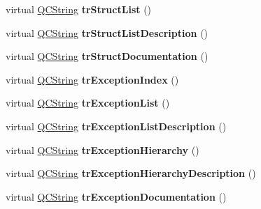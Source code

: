 \begin{DoxyCompactItemize}
\item 
\mbox{\label{class_translator_french_ad70154ed76d8e9ecb70dcb69670c85cc}} 
virtual \mbox{\hyperlink{class_q_c_string}{Q\+C\+String}} {\bfseries tr\+Struct\+List} ()
\item 
\mbox{\label{class_translator_french_a7088a03a1a5bf6859de2c712977f3110}} 
virtual \mbox{\hyperlink{class_q_c_string}{Q\+C\+String}} {\bfseries tr\+Struct\+List\+Description} ()
\item 
\mbox{\label{class_translator_french_a23f84074175cd65727c9ae6ccfa7d615}} 
virtual \mbox{\hyperlink{class_q_c_string}{Q\+C\+String}} {\bfseries tr\+Struct\+Documentation} ()
\item 
\mbox{\label{class_translator_french_a1d8d97128bdbfbdcb183505533dc48a5}} 
virtual \mbox{\hyperlink{class_q_c_string}{Q\+C\+String}} {\bfseries tr\+Exception\+Index} ()
\item 
\mbox{\label{class_translator_french_a92eadabf0ca943014bcb29bc86d3bf7f}} 
virtual \mbox{\hyperlink{class_q_c_string}{Q\+C\+String}} {\bfseries tr\+Exception\+List} ()
\item 
\mbox{\label{class_translator_french_ac1bca2751fbad9b0b410fd526b22ee14}} 
virtual \mbox{\hyperlink{class_q_c_string}{Q\+C\+String}} {\bfseries tr\+Exception\+List\+Description} ()
\item 
\mbox{\label{class_translator_french_afe4162765235e4630849a347ce37422b}} 
virtual \mbox{\hyperlink{class_q_c_string}{Q\+C\+String}} {\bfseries tr\+Exception\+Hierarchy} ()
\item 
\mbox{\label{class_translator_french_ab3ae00a1039534df9d99213e05d943db}} 
virtual \mbox{\hyperlink{class_q_c_string}{Q\+C\+String}} {\bfseries tr\+Exception\+Hierarchy\+Description} ()
\item 
\mbox{\label{class_translator_french_ac5320d9868e1343c46ef53dc92232bad}} 
virtual \mbox{\hyperlink{class_q_c_string}{Q\+C\+String}} {\bfseries tr\+Exception\+Documentation} ()

\end{DoxyCompactItemize}
